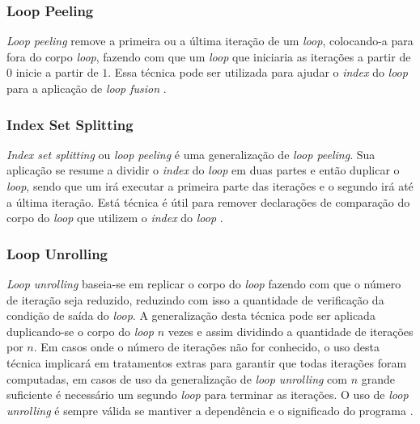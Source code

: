 \documentclass[12pt]{article}
\begin{document}
\subsubsection{Loop Peeling}

\textit{Loop peeling} remove a primeira ou a última iteração de um
\textit{loop}, colocando-a para fora do corpo \textit{loop}, fazendo com que um
\textit{loop} que iniciaria as iterações a partir de $0$ inicie a partir de $1$.
Essa técnica pode ser utilizada para ajudar o \textit{index} do \textit{loop}
para a aplicação de \textit{loop fusion} \cite{Song:2004}.

\subsubsection{Index Set Splitting}

\textit{Index set splitting} ou \textit{loop peeling} é uma generalização de 
\textit{loop peeling}. 
Sua aplicação se resume a dividir o \textit{index} do \textit{loop} em duas
partes e então duplicar o \textit{loop}, sendo que um irá executar a primeira
parte das iterações e o segundo irá até a última iteração.
Está técnica é útil para remover declarações de comparação do corpo do
\textit{loop} que utilizem o \textit{index} do \textit{loop}
\cite{Tasharofi:2010}.

\subsubsection{Loop Unrolling}

\textit{Loop unrolling} baseia-se em replicar o corpo do \textit{loop} fazendo
com que o número de iteração seja reduzido, reduzindo com isso a quantidade de
verificação da condição de saída do \textit{loop}.
A generalização desta técnica pode ser aplicada duplicando-se o corpo do
\textit{loop} $n$ vezes e assim dividindo a quantidade de iterações por $n$.
Em casos onde o número de iterações não for conhecido, o uso desta técnica
implicará em tratamentos extras para garantir que todas iterações foram
computadas, em casos de uso da generalização de \textit{loop unrolling} com $n$
grande suficiente é necessário um segundo \textit{loop} para terminar 
as iterações.
O uso de \textit{loop unrolling} é sempre válida se mantiver a
dependência e o significado do programa \cite{Dragomir:2009}.
\end{document}

